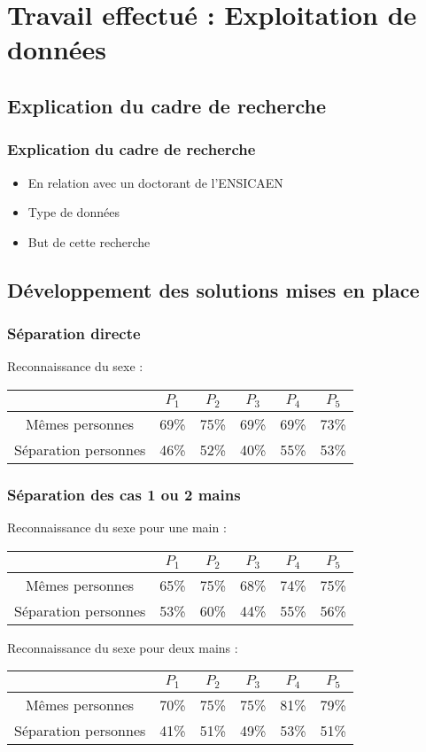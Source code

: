 \documentclass{beamer}
\begin{document}
\section[Travail effectué]{Travail effectué : Exploitation de données}
\subsection[Cadre]{Explication du cadre de recherche}
\begin{frame}
	\frametitle{Explication du cadre de recherche}
	\begin{itemize}
		\item En relation avec un doctorant de l'ENSICAEN
		\item Type de données
		\item But de cette recherche
	\end{itemize}
\end{frame}

\subsection[Dvlppmt]{Développement des solutions mises en place}
\begin{frame}
	\frametitle{Séparation directe}
Reconnaissance du sexe :
	\begin{tabular}{|*{6}{c|}}
	\hline
	 & $P_1$ & $P_2$ & $P_3$ & $P_4$ & $P_5$ \\
	\hline
	Mêmes personnes & 69\% & 75\% & 69\% & 69\% & 73\% \\
	\hline
	Séparation personnes & 46\% & 52\% & 40\% & 55\% & 53\% \\
	\hline
	\end{tabular}
\end{frame}

\begin{frame}
	\frametitle{Séparation des cas 1 ou 2 mains}
Reconnaissance du sexe pour une main :
	\begin{tabular}{|*{6}{c|}}
	\hline
	 & $P_1$ & $P_2$ & $P_3$ & $P_4$ & $P_5$ \\
	\hline
	Mêmes personnes & 65\% & 75\% & 68\% & 74\% & 75\% \\
	\hline
	Séparation personnes & 53\% & 60\% & 44\% & 55\% & 56\% \\
	\hline
	\end{tabular}

\bigskip
Reconnaissance du sexe pour deux mains :
	\begin{tabular}{|*{6}{c|}}
	\hline
	 & $P_1$ & $P_2$ & $P_3$ & $P_4$ & $P_5$ \\
	\hline
	Mêmes personnes & 70\% & 75\% & 75\% & 81\% & 79\% \\
	\hline
	Séparation personnes & 41\% & 51\% & 49\% & 53\% & 51\% \\
	\hline
	\end{tabular}
\end{frame}
\end{document}
